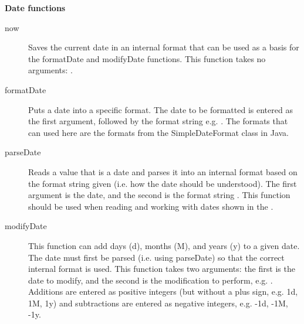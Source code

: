 \textbf{Date functions}\\
\begin{description}
\item [now]{Saves the current date in an internal format that can be used as a basis for the formatDate and modifyDate functions. This function takes no arguments: .}
\item [formatDate]{Puts a date into a specific format. The date to be formatted is entered as the first argument, followed by the format string e.g. . The formats that can used here are the formats from the SimpleDateFormat class in Java.}
\item [parseDate]{Reads a value that is a date and parses it into an internal format based on the format string given (i.e. how the date should be understood). The first argument is the date, and the second is the format string  . This function should be used when reading and working with dates shown in the \gdaut{}. }
\item [modifyDate]{This function can add days (d), months (M), and years (y) to a given date. The date must first be parsed (i.e. using parseDate) so that the correct internal format is used. This function takes two arguments: the first is the date to modify, and the second is the modification to perform, e.g. . Additions are entered as positive integers (but without a plus sign, e.g. 1d, 1M, 1y) and subtractions are entered as negative integers, e.g. -1d, -1M, -1y.}
\end{description}


